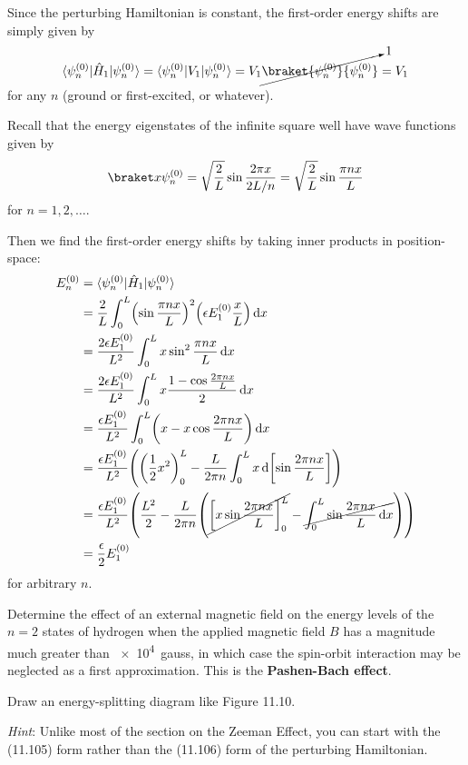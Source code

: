 \documentclass {../phys116}
\begin{document}
\begin {solution}
  \begin {problems}
  \item Since the perturbing Hamiltonian is constant, the first-order
    energy shifts are simply given by
    \[
      \bra {\psi_n^{(0)}} \hat H_1 \ket {\psi_n^{(0)}}
      = \bra {\psi_n^{(0)}} V_1 \ket {\psi_n^{(0)}}
      = V_1 \cancelto 1 {\braket {\psi_n^{(0)}} {\psi_n^{(0)}}}
      = V_1
    \]
    for any \(n\) (ground or first-excited, or whatever).

  \item Recall that the energy eigenstates of the
    infinite square well have wave functions given by
    \[
      \braket x {\psi_n^{(0)}}
      = \sqrt {\frac 2 L} \sin \frac {2 \pi x} {2 L / n}
      = \sqrt {\frac 2 L} \sin \frac {\pi n x} L
    \]
    for \(n = 1, 2, \dots\).

    Then we find the first-order energy shifts by taking inner
    products in position-space:
    \begin {align*}
      E_n^{(0)}
      &= \bra {\psi_n^{(0)}} \hat H_1 \ket {\psi_n^{(0)}} \\
      &= \frac 2 L \int_0^L \prn* {\sin \frac {\pi n x} L}^2
      \prn* {\epsilon E_1^{(0)} \frac x L} \dif x \\
      &= \frac {2 \epsilon E_1^{(0)}} {L^2} \int_0^L
      x \sin^2 \frac {\pi n x} L \dif x \\
      &= \frac {2 \epsilon E_1^{(0)}} {L^2} \int_0^L
      x \frac {1 - \cos \frac {2 \pi n x} L} 2 \dif x \\
      &= \frac {\epsilon E_1^{(0)}} {L^2}
      \int_0^L \prn* {x - x \cos \frac {2 \pi n x} L} \dif x \\
      &= \frac {\epsilon E_1^{(0)}} {L^2} \prn*{
        \prn* {\frac 1 2 x^2}_0^L
        - \frac L {2 \pi n}
        \int_0^L x \dif \sbr* {\sin \frac {2 \pi n x} L}
      } \\
      &= \frac {\epsilon E_1^{(0)}} {L^2} \prn* {
        \frac {L^2} 2
        - \frac L {2 \pi n} \prn* {
          \cancel {\sbr* {x \sin \frac {2 \pi n x} L}_0^L}
          - \cancel {\int_0^L \sin \frac {2 \pi n x} L \dif x}
        }
      } \\
      &= \frac \epsilon 2 E_1^{(0)}
    \end {align*}
    for arbitrary \(n\).
  \end {problems}
\end {solution}

\begin {exercise} 
  Determine the effect of an external magnetic field on the energy
  levels of the \(n=2\) states of hydrogen when the applied magnetic
  field \(B\) has a magnitude much greater than \SI {e4} {gauss}, in
  which case the spin-orbit interaction may be neglected as a first
  approximation.  This is the \textbf {Pashen-Bach effect}.

  Draw an energy-splitting diagram like Figure 11.10.

  \textit {Hint}: Unlike most of the section on the Zeeman Effect, you
  can start with the (11.105) form rather than the (11.106) form of
  the perturbing Hamiltonian.
\end {exercise}
\end{document}
